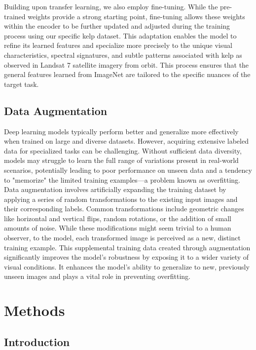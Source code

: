 \documentclass{article}
\begin{document}
Building upon transfer learning, we also employ fine-tuning. While the pre-trained weights provide a strong starting point, fine-tuning allows these weights within the encoder to be further updated and adjusted during the training process using our specific kelp dataset. This adaptation enables the model to refine its learned features and specialize more precisely to the unique visual characteristics, spectral signatures, and subtle patterns associated with kelp as observed in Landsat 7 satellite imagery from orbit. This process ensures that the general features learned from ImageNet are tailored to the specific nuances of the target task.

\subsection{Data Augmentation} 

Deep learning models typically perform better and generalize more effectively when trained on large and diverse datasets. However, acquiring extensive labeled data for specialized tasks can be challenging. Without sufficient data diversity, models may struggle to learn the full range of variations present in real-world scenarios, potentially leading to poor performance on unseen data and a tendency to "memorize" the limited training examples—a problem known as overfitting. Data augmentation involves artificially expanding the training dataset by applying a series of random transformations to the existing input images and their corresponding labels. Common transformations include geometric changes like horizontal and vertical flips, random rotations, or the addition of small amounts of noise. While these modifications might seem trivial to a human observer, to the model, each transformed image is perceived as a new, distinct training example. This supplemental training data created through augmentation significantly improves the model's robustness by exposing it to a wider variety of visual conditions. It enhances the model's ability to generalize to new, previously unseen images and plays a vital role in preventing overfitting.



\section{Methods}

\subsection{Introduction}
\end{document}
